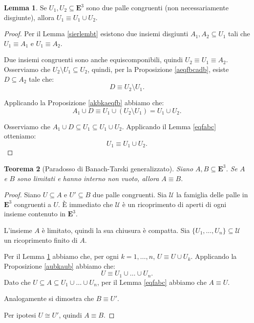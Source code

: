 \documentclass[a4paper,oneside,11pt]{book}
\theoremstyle{definition} \newtheorem{Def}{Definizione}
\theoremstyle{plain} \newtheorem{teo}{Teorema}
\theoremstyle{plain} \newtheorem{cor}[teo]{Corollario}
\theoremstyle{definition} \newtheorem{lem}[teo]{Lemma}
\theoremstyle{plain} \newtheorem{pro}[teo]{Proposizione}
\newcommand{\eqf}{\equiv}
\begin{document}
	\begin{lem}\label{u1u2eqfu1uu2} %
		Se $U_1, U_2 \subseteq \mathbf{E}^3$ sono due palle congruenti (non necessariamente disgiunte), allora $U_1 \eqf U_1 \cup U_2$.
	\end{lem}
	
	\begin{proof}
		Per il Lemma \ref{sierlembt} esistono due insiemi disgiunti $A_1, A_2 \subseteq U_1$ tali che $U_1 \eqf A_1$ e $U_1 \eqf A_2$.
		
		Due insiemi congruenti sono anche equiscomponibili, quindi $U_2 \eqf U_1 \eqf A_2$. Osserviamo che $U_2 \setminus U_1 \subseteq U_2$, quindi, per la Proposizione \ref{aeqfbcadb}, esiste $D \subseteq A_2$ tale che:
		\begin{equation*}
			D \eqf U_2 \setminus U_1 \text{.}
		\end{equation*}
		
		Applicando la Proposizione \ref{akbkaeqfb} abbiamo che:
		\begin{equation*}
			A_1 \cup D \eqf U_1 \cup (U_2 \setminus U_1) = U_1 \cup U_2 \text{.}
		\end{equation*}
		
		Osserviamo che $A_1 \cup D \subseteq U_1 \subseteq U_1 \cup U_2$. Applicando il Lemma \ref{eqfabc} otteniamo:
		\begin{equation*}
			U_1 \eqf U_1 \cup U_2 \text{.}
		\end{equation*}
	\end{proof}		
	
	\begin{teo}[Paradosso di Banach-Tarski generalizzato]
		Siano $A, B \subseteq \mathbf{E}^3$. Se $A$ e $B$ sono limitati e hanno interno non vuoto, allora $A \eqf B$.
	\end{teo}
	
	\begin{proof}
		Siano $U \subseteq A$ e $U' \subseteq B$ due palle congruenti. Sia $\mathcal{U}$ la famiglia delle palle in $\mathbf{E}^3$ congruenti a $U$. È immediato che $\mathcal{U}$ è un ricoprimento di aperti di ogni insieme contenuto in $\mathbf{E}^3$.
		
		L'insieme $A$ è limitato, quindi la sua chiusura è compatta. Sia $\{U_1, \dots, U_n\} \subseteq \mathcal{U}$ un ricoprimento finito di $A$.
		
		Per il Lemma \ref{u1u2eqfu1uu2} abbiamo che, per ogni $k = 1, \dots, n$, $U \eqf U \cup U_k$. Applicando la Proposizione \ref{aubkaub} abbiamo che: 
		\begin{equation*}
			U \eqf U_1 \cup \dots \cup U_n \text{.}
		\end{equation*}
		Dato che $U \subseteq A \subseteq U_1 \cup \dots \cup U_n$, per il Lemma \ref{eqfabc} abbiamo che $A \eqf U$.
		
		Analogamente si dimostra che $B \eqf U'$.
		
		Per ipotesi $U \cong U'$, quindi $A \eqf B$.
	\end{proof}
\end{document}

